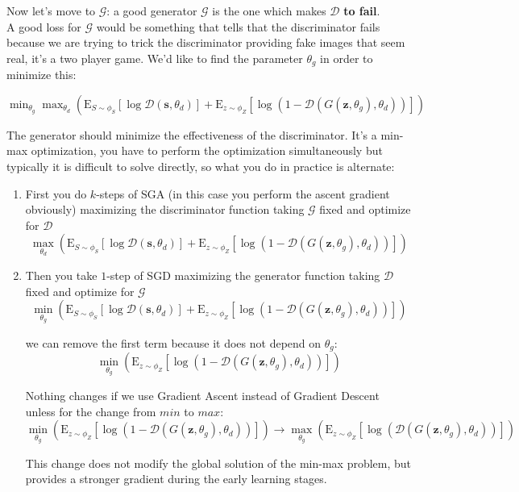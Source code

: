Now let's move to $\mathcal{G}$: a good generator $\mathcal{G}$ is the one which makes $\mathcal{D}$ \textbf{to fail}. \\
A good loss for $\mathcal{G}$ would be something that tells that the discriminator fails because we are trying to trick the discriminator providing fake images that seem real, it's a two player game. We'd like to find the parameter $\theta_{g}$ in order to minimize this:
\begin{center}
    $\min _{\theta_{g}} \max _{\theta_{d}}\left(\mathrm{E}_{S \sim \phi_{S}}\left[\log \mathcal{D}\left(\mathbf{s}, \theta_{d}\right)\right]+\mathrm{E}_{z \sim \phi_{Z}}\left[\log \left(1-\mathcal{D}\left(G\left(\mathbf{z}, \theta_{g}\right), \theta_{d}\right)\right)\right]\right)$
\end{center}
The generator should minimize the effectiveness of the discriminator. It's a min-max optimization, you have to perform the optimization simultaneously but typically it is difficult to solve directly, so what you do in practice is alternate: 
\begin{enumerate}
    \item First you do $k$-steps of SGA (in this case you perform the ascent gradient obviously) maximizing the discriminator function taking $\mathcal{G}$ fixed and optimize for $\mathcal{D}$
    $$ \max _{\theta_{d}}\left(\mathrm{E}_{S \sim \phi_{S}}\left[\log \mathcal{D}\left(\mathbf{s}, \theta_{d}\right)\right]+\mathrm{E}_{z \sim \phi_{Z}}\left[\log \left(1-\mathcal{D}\left(G\left(\mathbf{z}, \theta_{g}\right), \theta_{d}\right)\right)\right]\right)$$
    
    \item Then  you take $1$-step of SGD  maximizing the generator function taking $\mathcal{D}$ fixed and optimize for $\mathcal{G}$
    $$ \min _{\theta_{g}}\left(\mathrm{E}_{S \sim \phi_{S}}\left[\log \mathcal{D}\left(\mathbf{s}, \theta_{d}\right)\right]+\mathrm{E}_{z \sim \phi_{Z}}\left[\log \left(1-\mathcal{D}\left(G\left(\mathbf{z}, \theta_{g}\right), \theta_{d}\right)\right)\right]\right)$$
    
    we can remove the first term because it does not depend on $\theta_g$:
    $$ \min _{\theta_{g}}\left(\mathrm{E}_{z \sim \phi_{Z}}\left[\log \left(1-\mathcal{D}\left(G\left(\mathbf{z}, \theta_{g}\right), \theta_{d}\right)\right)\right]\right)$$
    
    Nothing changes if we use Gradient Ascent instead of Gradient Descent unless for the change from $min$ to $max$: 
    $$ \min _{\theta_{g}}\left(\mathrm{E}_{z \sim \phi_{Z}}\left[\log \left(1-\mathcal{D}\left(G\left(\mathbf{z}, \theta_{g}\right), \theta_{d}\right)\right)\right]\right) \longrightarrow \max _{\theta_{g}}\left(\mathrm{E}_{z \sim \phi_{Z}}\left[\log \left(\mathcal{D}\left(G\left(\mathbf{z}, \theta_{g}\right), \theta_{d}\right)\right)\right]\right)$$
    
    This change does not modify the global solution of the min-max problem, but provides a stronger gradient during the early learning stages.
\end{enumerate}
